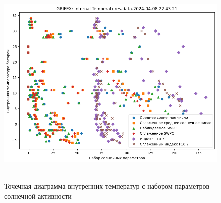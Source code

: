 \documentclass[14pt, a4paper]{extreport}
\begin{document}
    \begin{figure}[htbp]
        \centering
        \includegraphics[width=1.0\textwidth]{grifex_battery_vs_solar}
        ~\caption{Точечная диаграмма внутренних температур с набором параметров солнечной активности}
        \label{fig:grifex_battery_vs_solar}
    \end{figure}
\end{document}
